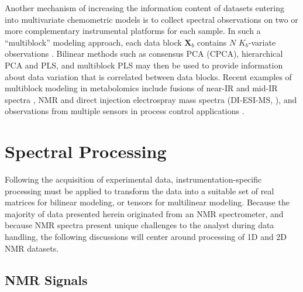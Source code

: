 \begin{doublespace}
Another mechanism of increasing the information content of datasets entering
into multivariate chemometric models is to collect spectral observations on
two or more complementary instrumental platforms for each sample. In such a
``multiblock'' modeling approach, each data block $\mathbf{X}_b$ contains $N$
$K_b$-variate observations \cite{westerhuis:jchemo1998,smilde:jchemo2003}.
Bilinear methods such as consensus PCA (CPCA), hierarchical PCA and PLS, and
multiblock PLS may then be used to provide information about data variation
that is correlated between data blocks. Recent examples of multiblock modeling
in metabolomics include fusions of near-IR and mid-IR spectra
\cite{bras:cils2005}, \hnmr{} NMR and direct injection electrospray mass
spectra (DI-ESI-MS, \cite{marshall:metab2015}), and observations from multiple
sensors in process control applications \cite{ferreira:jchemo2010}.
\end{doublespace}

\section{Spectral Processing}

\begin{doublespace}
Following the acquisition of experimental data, instrumentation-specific
processing must be applied to transform the data into a suitable set of
real matrices for bilinear modeling, or tensors for multilinear modeling.
Because the majority of data presented herein originated from an NMR
spectrometer, and because NMR spectra present unique challenges to the
analyst during data handling, the following discussions will center around
processing of 1D and 2D NMR datasets.
\end{doublespace}

\subsection{NMR Signals}

